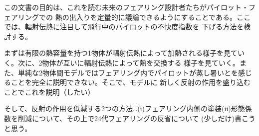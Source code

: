 この文書の目的は、これを読む未来のフェアリング設計者たちがパイロット・フェアリングでの
熱の出入りを定量的に議論できるようにすることである。ここでは、輻射伝熱に注目して飛行中のパイロットの不快度指数を
下げる方法を検討する。\par
まずは有限の熱容量を持つ1物体が輻射伝熱によって加熱される様子を見ていく。次に、2物体が互いに輻射伝熱によって熱を交換する
様子を見ていく。また、単純な2物体間モデルではフェアリング内でパイロットが蒸し暑いとを感じることを完全に説明できない。そこで、モデルに
新しく反射の作用を盛り込むことでこれを説明（したい）\par
そして、反射の作用を低減する2つの方法…(i)フェアリング内側の塗装(ii)形態係数を削減について、その上で24代フェアリングの反省について
(少しだけ)書こうと思う。